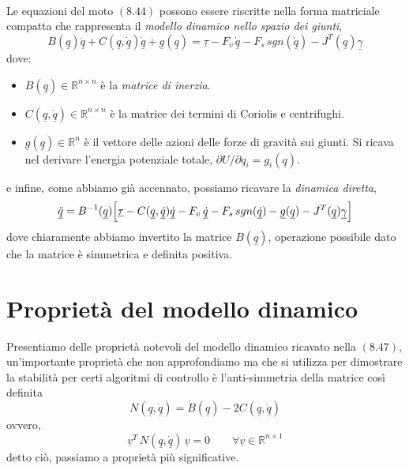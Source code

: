 \paragraph{}
Le equazioni del moto $(8.44)$ possono essere riscritte nella forma matriciale compatta che rappresenta il \emph{modello dinamico nello spazio dei giunti},
\begin{equation}
	B(\underline{q})\ddot{\underline{q}} + C(\underline{q}, \underline{\dot{q}}) \underline{\dot{q}} + \underline{g}(\underline{q}) = \underline{\tau} - F_v \,\underline{\dot{q}} - F_s \, sgn(\underline{\dot{q}}) - J^T(\underline{q}) \underline{\gamma}
\end{equation}
dove:
\begin{itemize}
	\item $B(\underline{q}) \in \mathbb{R}^{n \times n}$ è la \emph{matrice di inerzia}.
	\item $C(\underline{q}, \underline{\dot{q}}) \in \mathbb{R}^{n \times n}$ è la matrice dei termini di Coriolis e centrifughi.
	\item $\underline{g}(\underline{q}) \in \mathbb{R}^n$ è il vettore delle azioni delle forze di gravità sui giunti. Si ricava nel derivare l'energia potenziale totale, $\partial U / \partial q_i = g_i(\underline{q})$.
\end{itemize}
e infine, come abbiamo già accennato, possiamo ricavare la \emph{dinamica diretta},
\begin{equation}
	\underline{\ddot{q}} = B^{-1}(\underline{q}) \Bigl[ \underline{\tau} - C(\underline{q}, \underline{\dot{q}})\underline{\dot{q}} - F_v \,\underline{\dot{q}} - F_s \, sgn(\underline{\dot{q}}) - \underline{g}(\underline{q}) - J^T(\underline{q}) \underline{\gamma} \Bigr]
\end{equation}
dove chiaramente abbiamo invertito la matrice $B(\underline{q})$, operazione possibile dato che la matrice è simmetrica e definita positiva.

\section{Proprietà del modello dinamico}
Presentiamo delle proprietà notevoli del modello dinamico ricavato nella $(8.47)$, un'importante proprietà che non approfondiamo ma che si utilizza per dimostrare la stabilità per certi algoritmi di controllo è l'anti-simmetria della matrice così definita
\begin{equation}
	N(\underline{q}, \underline{\dot{q}}) = \dot{B}(\underline{q}) - 2C(\underline{q}, \underline{\dot{q}})
\end{equation}
ovvero,
\begin{equation}
	\underline{v}^T \, N(\underline{q}, \underline{\dot{q}})\, \underline{v} = 0 \qquad \forall \underline{v} \in \mathbb{R}^{n \times 1}
\end{equation}
detto ciò, passiamo a proprietà più significative.

